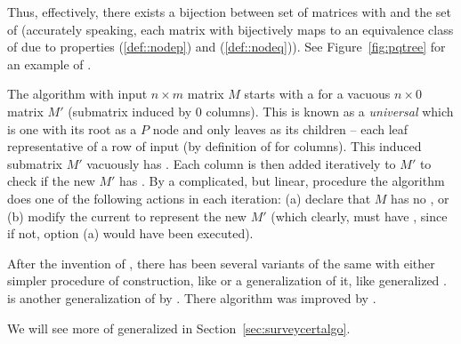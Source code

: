 Thus, effectively, there exists a bijection between set of matrices
with \COP and the set of \PQtrees (accurately speaking, each matrix
with \COP bijectively maps to an equivalence class of \PQtrees due to
properties (\ref{def::nodep}) and (\ref{def::nodeq})). See
Figure~\ref{fig:pqtree} for an example of \PQtree.

\figpqtree

The \cite{bl76} algorithm with input $n \times m$ matrix $M$ starts
with a \PQtree for a vacuous $n \times 0$ matrix $M'$ (submatrix
induced by 0 columns). This is known as a {\em universal} \PQtree
which is one with its root as a $P$ node and only leaves as its
children -- each leaf representative of a row of input (by definition
of \COP for columns). This induced submatrix $M'$ vacuously has \COP.
Each column is then added iteratively to $M'$ to check if the new $M'$
has \COP.  By a complicated, but linear, procedure the algorithm does
one of the following actions in each iteration: (a) declare that $M$
has no \COP, or (b) modify the current \PQtree to represent the new
$M'$ (which clearly, must have \COP, since if not, option (a) would
have been executed).

After the invention of \PQtrees, there has been several variants of
the same with either simpler procedure of construction, like \PCtree
\cite{wlh01} or a generalization of it, like
generalized \PQtree \cite{mcc04}. \PQRtree is another generalization
of \PQtree by \cite{mm96,mpt98}. There algorithm was improved by
\cite{tm05} . %
    

We will see more of generalized \PQtree in Section~\ref{sec:surveycertalgo}.




%


%




